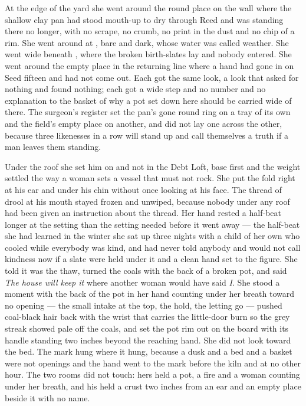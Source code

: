 At the edge of the yard she went around the round place on the wall where the shallow clay pan had stood mouth-up to dry through Reed and was standing there no longer, with no scrape, no crumb, no print in the dust and no chip of a rim. She went around  at , bare and dark, whose water was called weather. She went wide beneath , where the broken birth-slates lay and nobody entered. She went around the empty place in the returning line where a hand had gone in on Seed fifteen and had not come out. Each got the same look, a look that asked for nothing and found nothing; each got a wide step and no number and no explanation to the basket of why a pot set down here should be carried wide of there. The surgeon's register set the pan's gone round ring on a tray of its own and the field's empty place on another, and did not lay one across the other, because three likenesses in a row will stand up and call themselves a truth if a man leaves them standing.

Under the roof she set him on  and not in the Debt Loft, base first and the weight settled the way a woman sets a vessel that must not rock. She put the fold right at his ear and under his chin without once looking at his face. The thread of drool at his mouth stayed frozen and unwiped, because nobody under any roof had been given an instruction about the thread. Her hand rested a half-beat longer at the setting than the setting needed before it went away --- the half-beat she had learned in the winter she sat up three nights with a child of her own who cooled while everybody was kind, and had never told anybody and would not call kindness now if a slate were held under it and a clean hand set to the figure. She told  it was the thaw, turned the coals with the back of a broken pot, and said \emph{The house will keep it} where another woman would have said \emph{I}. She stood a moment with the back of the pot in her hand counting under her breath toward no opening --- the small intake at the top, the hold, the letting go --- pushed coal-black hair back with the wrist that carries the little-door burn so the grey streak showed pale off the coals, and set the pot rim out on the board with its handle standing two inches beyond the reaching hand. She did not look toward the bed. The mark hung where it hung, because a dusk and a bed and a basket were not openings and the hand went to the mark before the kiln and at no other hour. The two rooms did not touch: hers held a pot, a fire and a woman counting under her breath, and his held a crust two inches from an ear and an empty place beside it with no name.

